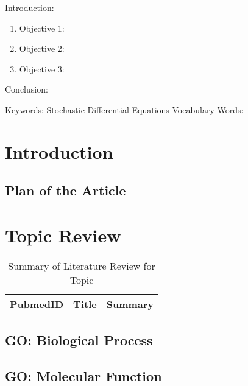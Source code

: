 

\twocolumn
\scriptsize
\begin{frontmatter}
		\title{}
		\author{}
		\address{The Mathematical Learning Space}
\end{frontmatter}	

Introduction:
\begin{enumerate}
\item Objective 1:
\item Objective 2:
\item Objective 3:
\end{enumerate}
Conclusion:

Keywords: Stochastic Differential Equations
Vocabulary Words:

\section{Introduction}

\subsection{Plan of the Article}


\section{Topic Review}

\begin{table}[H]
\centering
\begin{tabular}{r|p{12cm}|l}
\hline
PubmedID  & Title & Summary \\
\hline	
\hline
	\end{tabular}
	\caption{Summary of Literature Review for Topic}
\end{table}		

\subsection{GO: Biological Process}

\subsection{GO: Molecular Function}

